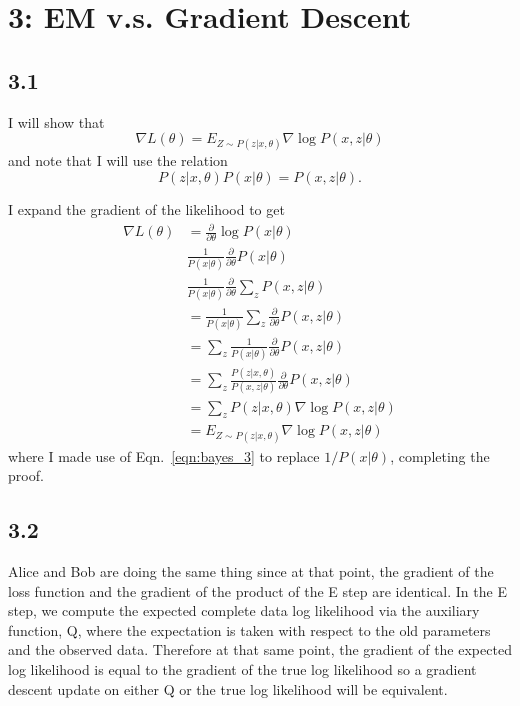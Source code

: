 \documentclass[12pt]{amsart}
\begin{document}
\section*{3: EM v.s. Gradient Descent}

\subsection*{3.1}
I will show that
\begin{equation}
\nabla L(\theta) = E_{Z {\sim}P(z|x,\theta)} \nabla \log P(x,z|\theta)
\end{equation}
and note that I will use the relation
\begin{equation} \label{eqn:bayes_3}
P(z|x,\theta)P(x|\theta) = P(x,z|\theta).
\end{equation}

I expand the gradient of the likelihood to get
\begin{equation}
\begin{split}
\nabla L(\theta) & = \frac{\partial}{\partial \theta} \log P(x|\theta) \\
& \frac{1}{P(x|\theta)} \frac{\partial}{\partial \theta} P(x|\theta) \\
& \frac{1}{P(x|\theta)} \frac{\partial}{\partial \theta} \sum_z P(x, z|\theta) \\
& =  \frac{1}{P(x|\theta)} \sum_z  \frac{\partial}{\partial \theta} P(x, z|\theta) \\
& = \sum_z  \frac{1}{P(x|\theta)}  \frac{\partial}{\partial \theta} P(x, z|\theta) \\
& = \sum_z  \frac{P(z|x,\theta)}{P(x,z|\theta)}  \frac{\partial}{\partial \theta} P(x, z|\theta) \\
&= \sum_z P(z|x,\theta) \nabla \log P(x,z|\theta) \\
& =  E_{Z {\sim}P(z|x,\theta)} \nabla \log P(x,z|\theta)
\end{split}
\end{equation}
where I made use of Eqn.~\ref{eqn:bayes_3} to replace $1/P(x|\theta)$, completing the proof.

\subsection*{3.2}
Alice and Bob are doing the same thing since at that point, the gradient of the loss function and the gradient of the product of the E step are identical.  In the E step, we compute the expected complete data log likelihood via the auxiliary function, Q, where the expectation is taken with respect to the old parameters and the observed data.  Therefore at that same point, the gradient of the expected log likelihood is equal to the gradient of the true log likelihood so a gradient descent update on either Q or the true log likelihood will be equivalent.
\end{document}

